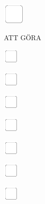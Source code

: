 \documentclass[11pt,titlepage]{article}
\begin{document}
\vspace{12mm}

\noindent
\includegraphics[]{checkbox-6mm.pdf}

\pagebreak

\small %
\hfill ATT GÖRA

\vspace{6mm}

\noindent
\includegraphics[]{checkbox-4mm.pdf}

\vspace{10mm}

\noindent
\includegraphics[]{checkbox-4mm.pdf}

\vspace{10mm}

\noindent
\includegraphics[]{checkbox-4mm.pdf}

\vspace{10mm}

\noindent
\includegraphics[]{checkbox-4mm.pdf}

\vspace{10mm}

\noindent
\includegraphics[]{checkbox-4mm.pdf}

\vspace{10mm}

\noindent
\includegraphics[]{checkbox-4mm.pdf}

\vspace{10mm}

\noindent
\includegraphics[]{checkbox-4mm.pdf}
\end{document}
